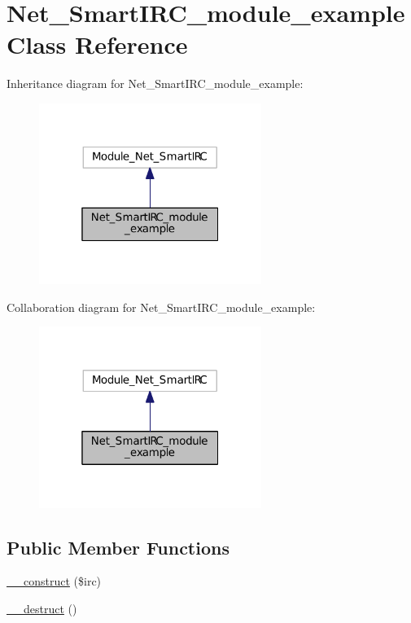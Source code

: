 \hypertarget{classNet__SmartIRC__module__example}{}\section{Net\+\_\+\+Smart\+I\+R\+C\+\_\+module\+\_\+example Class Reference}
\label{classNet__SmartIRC__module__example}


Inheritance diagram for Net\+\_\+\+Smart\+I\+R\+C\+\_\+module\+\_\+example\+:
\nopagebreak
\begin{figure}[H]
\begin{center}
\leavevmode
\includegraphics[width=205pt]{dd/de7/classNet__SmartIRC__module__example__inherit__graph}
\end{center}
\end{figure}


Collaboration diagram for Net\+\_\+\+Smart\+I\+R\+C\+\_\+module\+\_\+example\+:
\nopagebreak
\begin{figure}[H]
\begin{center}
\leavevmode
\includegraphics[width=205pt]{df/de1/classNet__SmartIRC__module__example__coll__graph}
\end{center}
\end{figure}
\subsection*{Public Member Functions}
\begin{DoxyCompactItemize}
\item 
\hyperlink{classNet__SmartIRC__module__example_a314c836af3c9d8950164bf7d9bb785d6}{\+\_\+\+\_\+construct} (\$irc)
\item 
\hyperlink{classNet__SmartIRC__module__example_a20445df064117b852223745ba9a2aa22}{\+\_\+\+\_\+destruct} ()
\end{DoxyCompactItemize}
